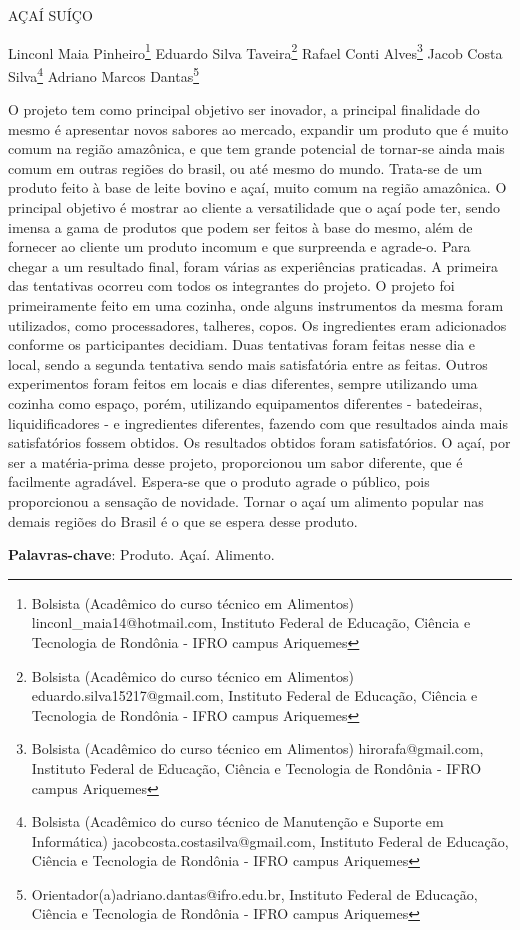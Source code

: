 \documentclass[article,12pt,onesidea,4paper,english,brazil]{abntex2}
\begin{document}
	
	
	\frenchspacing 
	
	\begin{center}
		\LARGE AÇAÍ SUÍÇO
		
		\normalsize
		Linconl Maia Pinheiro\footnote{Bolsista (Acadêmico do curso técnico em Alimentos) linconl\_maia14@hotmail.com, Instituto Federal de Educação, Ciência e Tecnologia de Rondônia - IFRO campus Ariquemes} 
		Eduardo Silva Taveira\footnote{Bolsista (Acadêmico do curso técnico em Alimentos) eduardo.silva15217@gmail.com, Instituto Federal de Educação, Ciência e Tecnologia de Rondônia - IFRO campus Ariquemes} 
		Rafael Conti Alves\footnote{Bolsista (Acadêmico do curso técnico em Alimentos) hirorafa@gmail.com, Instituto Federal de Educação, Ciência e Tecnologia de Rondônia - IFRO campus Ariquemes} 
		Jacob Costa Silva\footnote{Bolsista (Acadêmico do curso técnico de Manutenção e Suporte em Informática) jacobcosta.costasilva@gmail.com, Instituto Federal de Educação, Ciência e Tecnologia de Rondônia - IFRO campus Ariquemes}
		Adriano Marcos Dantas\footnote{Orientador(a)adriano.dantas@ifro.edu.br, Instituto Federal de Educação, Ciência e Tecnologia de Rondônia - IFRO campus Ariquemes} 
	\end{center}
	
	\noindent O projeto tem como principal objetivo ser inovador, a principal finalidade do mesmo é apresentar novos sabores ao mercado, expandir um produto que é muito comum na região amazônica, e que tem grande potencial de tornar-se ainda mais comum em outras regiões do brasil, ou até mesmo do mundo. Trata-se de um produto feito à base de leite bovino e açaí, muito comum na região amazônica. O principal objetivo é mostrar ao cliente a versatilidade que o açaí pode ter, sendo imensa a gama de produtos que podem ser feitos à base do mesmo, além de fornecer ao cliente um produto incomum e que surpreenda e agrade-o. Para chegar a um resultado final, foram várias as experiências praticadas. A primeira das tentativas ocorreu com todos os integrantes do projeto. O projeto foi primeiramente feito em uma cozinha, onde alguns instrumentos da mesma foram utilizados, como processadores, talheres, copos. Os ingredientes eram adicionados conforme os participantes decidiam. Duas tentativas foram feitas nesse dia e local, sendo a segunda tentativa sendo mais satisfatória entre as feitas. Outros experimentos foram feitos em locais e dias diferentes, sempre utilizando uma cozinha como espaço, porém, utilizando equipamentos diferentes - batedeiras, liquidificadores - e ingredientes diferentes, fazendo com que resultados ainda mais satisfatórios fossem obtidos. Os resultados obtidos foram satisfatórios. O açaí, por ser a matéria-prima desse projeto, proporcionou um sabor diferente, que é facilmente agradável. Espera-se que o produto agrade o público, pois proporcionou a sensação de novidade. Tornar o açaí um alimento popular nas demais regiões do Brasil é o que se espera desse produto.
	
	\vspace{\onelineskip}
	
	\noindent
	\textbf{Palavras-chave}: Produto. Açaí. Alimento.
	
\end{document}
